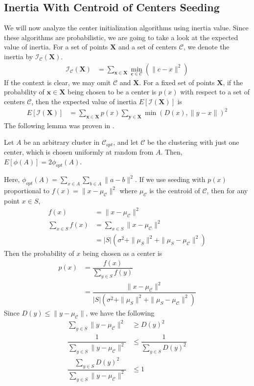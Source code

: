 \documentclass[twoside, 11pt]{article}
\newcommand{\x}{\mathbf{x}}
\newcommand{\X}{\mathbf{X}}
\newcommand{\y}{\mathbf{y}}
\renewcommand{\c}{\mathbf{c}}
\newcommand{\C}{\mathcal{C}}
\newcommand{\I}{\mathcal{I}}
\begin{document}
	\subsection{Inertia With Centroid of Centers Seeding}
	We will now analyze the center initialization algorithms using inertia value. Since these algorithms are probabilistic, we are going to take a look at the expected value of inertia. For a set of points $\X$ and a set of centers $\C$, we denote the inertia by $\I_\C(\X)$.
		\begin{align*}
			\I_\C(\X) & = \sum_{\x\in\X}\min_{\c\in\C}(\|c-x\|^2)
		\end{align*}
	If the context is clear, we may omit $\C$ and $\X$. For a fixed set of points $\X$, if the probability of $\x\in\X$ being chosen to be a center is $p(x)$ with respect to a set of centers $\C$, then the expected value of inertia $E[\I(\X)]$ is
		\begin{align*}
			E[\I(\X)] & = \sum_{\x\in\X}p(x)\sum_{\y\in\X}\min(D(x),\|y-x\|)^2
		\end{align*}
	The following lemma was proven in \cite[Lemma $3.2$]{kmeans++}.
		\begin{lemma}
			Let $A$ be an arbitrary cluster in $\C_{opt}$, and let $\C$ be the clustering with just one center, which is chosen uniformly at random from $A$. Then, $E[\phi(A)]=2\phi_{opt}(A)$.
		\end{lemma}
	Here, $\phi_{opt}(A)=\sum_{x\in A}\sum_{b\in A}\|a-b\|^2$. If we use seeding with $p(x)$ proportional to $f(x)=\|x-\mu_{\C}\|^2$ where $\mu_{\C}$ is the centroid of $\mathcal{C}$, then for any point $x\in S$,
		\begin{align*}
			f(x) & = \|x-\mu_{\C}\|^2\\
			\sum_{x\in S}f(x) 
				& = \sum_{x\in S}\|x-\mu_{\C}\|^2\\
				& = |S|(\sigma^2+\|\mu_S\|^2+\|\mu_S-\mu_{\C}\|^2)
		\end{align*}
	Then the probability of $x$ being chosen as a center is
		\begin{align*}
			p(x) & = \dfrac{f(x)}{\sum_{y\in S}f(y)}\\
				 & = \dfrac{\|x-\mu_{\C}\|^2}{|S|(\sigma^2+\|\mu_S\|^2+\|\mu_{S}-\mu_{\C}\|^2)}
		\end{align*}
	Since $D(y)\leq \|y-\mu_{\C}\|$, we have the following
		\begin{align*}
			\sum_{y\in S}\|y-\mu_{\C}\|^2 & \geq D(y)^2\\
			\dfrac{1}{\sum_{y\in S}\|y-\mu_{\C}\|^2} & \leq \dfrac{1}{\sum_{y\in S}D(y)^2}\\
			\dfrac{\sum_{y\in S}D(y)^2}{\sum_{y\in S}\|y-\mu_{\C}\|^2} & \leq 1
		\end{align*}
\end{document}
